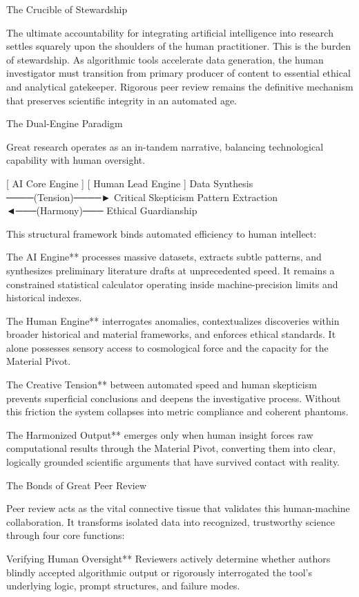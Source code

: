 The Crucible of Stewardship

The ultimate accountability for integrating artificial intelligence into research settles squarely upon the shoulders of the human practitioner. This is the burden of stewardship. As algorithmic tools accelerate data generation, the human investigator must transition from primary producer of content to essential ethical and analytical gatekeeper. Rigorous peer review remains the definitive mechanism that preserves scientific integrity in an automated age.

The Dual-Engine Paradigm

Great research operates as an in-tandem narrative, balancing technological capability with human oversight.

[ AI Core Engine ]                    [ Human Lead Engine ]
Data Synthesis  ────(Tension)────►  Critical Skepticism
Pattern Extraction ◄───(Harmony)───  Ethical Guardianship

This structural framework binds automated efficiency to human intellect:

The AI Engine** processes massive datasets, extracts subtle patterns, and synthesizes preliminary literature drafts at unprecedented speed. It remains a constrained statistical calculator operating inside machine-precision limits and historical indexes.

The Human Engine** interrogates anomalies, contextualizes discoveries within broader historical and material frameworks, and enforces ethical standards. It alone possesses sensory access to cosmological force and the capacity for the Material Pivot.

The Creative Tension** between automated speed and human skepticism prevents superficial conclusions and deepens the investigative process. Without this friction the system collapses into metric compliance and coherent phantoms.

The Harmonized Output** emerges only when human insight forces raw computational results through the Material Pivot, converting them into clear, logically grounded scientific arguments that have survived contact with reality.

The Bonds of Great Peer Review

Peer review acts as the vital connective tissue that validates this human-machine collaboration. It transforms isolated data into recognized, trustworthy science through four core functions:

Verifying Human Oversight**  
  Reviewers actively determine whether authors blindly accepted algorithmic output or rigorously interrogated the tool’s underlying logic, prompt structures, and failure modes.


